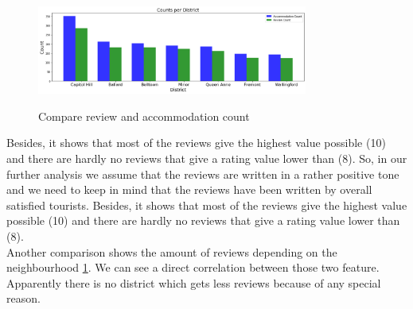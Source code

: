 \documentclass[journal]{IEEEtran}
\begin{document}
%
\begin{figure}
  \begin{center}
  \includegraphics[width=3.5in]{photo/3_count_per_district.png}\\
  \caption{Compare review and accommodation count}\label{review_district}
  \end{center}
\end{figure}
%

Besides, it shows that most of the reviews give the highest value possible (10) and there are hardly no reviews that give a rating value lower than (8). So, in our further analysis we assume that the reviews are written in a rather positive tone and we need to keep in mind that the reviews have been written by overall satisfied tourists. Besides, it shows that most of the reviews give the highest value possible (10) and there are hardly no reviews that give a rating value lower than (8).\\ 
Another comparison shows the amount of reviews depending on the neighbourhood \ref{review_district}. We can see a direct correlation between those two feature. Apparently there is no district which gets less reviews because of any special reason. \\
\end{document}
